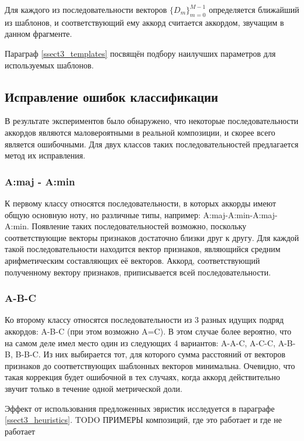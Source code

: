 Для каждого из последовательности векторов $\{D_m\}_{m=0}^{M-1}$ определяется
ближайший из шаблонов, и соответствующий ему аккорд считается аккордом, звучащим
в данном фрагменте.

Параграф \ref{ssect3_templates} посвящён подбору наилучших параметров для
используемых шаблонов.

\subsection{Исправление ошибок классификации} \label{ssect1_errcorr}

В результате экспериментов было обнаружено, что некоторые последовательности
аккордов являются маловероятными в реальной композиции, и скорее всего является
ошибочными. Для двух классов таких последовательностей предлагается метод их
исправления.

\subsubsection{A:maj - A:min}

К первому классу относятся последовательности, в которых аккорды имеют общую
основную ноту, но различные типы, например: A:maj-A:min-A:maj-A:min. Появление
таких последовательностей возможно, поскольку соответствующие векторы признаков
достаточно близки друг к другу. Для каждой такой последовательности находится
вектор признаков, являющийся средним арифметическим составляющих её векторов.
Аккорд, соответствующий полученному вектору признаков, приписывается всей
последовательности.

\subsubsection{A-B-C}

Ко второму классу относятся последовательности из 3 разных идущих подряд
аккордов: A-B-C (при этом возможно A=C). В этом случае более вероятно, что на
самом деле имел место один из следующих 4 вариантов: A-A-C, A-C-C, A-B-B,
B-B-C. Из них выбирается тот, для которого сумма расстояний от векторов
признаков до соответствующих шаблонных векторов минимальна. Очевидно, что такая
коррекция будет ошибочной в тех случаях, когда аккорд действительно звучит
только в течение одной метрической доли.

Эффект от использования предложенных эвристик исследуется в параграфе
\ref{ssect3_heuristics}.
TODO ПРИМЕРЫ композиций, где это работает и где не работает

